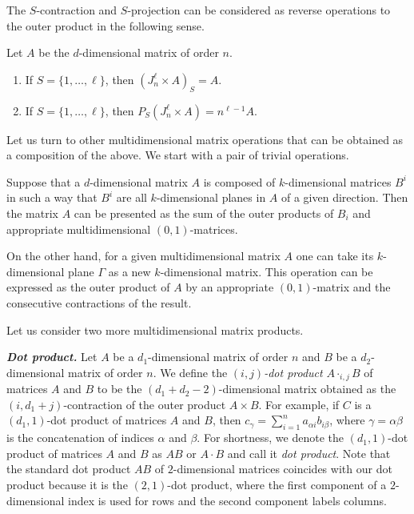 \documentclass[a4paper]{article}
\begin{document}
The $S$-contraction and $S$-projection can be considered as  reverse operations to the outer product in the following sense. 


\begin{utv}
Let $A$ be the $d$-dimensional matrix of order $n$.
\begin{enumerate}
\item If  $S = \{ 1, \ldots, \ell\}$, then $(J_n^{\ell} \times A)_S = A$.
\item If  $S = \{ 1, \ldots, \ell\}$, then  $P_S (J_n^{\ell} \times A) = n^{\ell -1} A$.
\end{enumerate}
\end{utv}


Let us turn to other multidimensional matrix operations that can be obtained as a composition of the above.  We start with a pair of trivial operations.

Suppose that  a $d$-dimensional matrix $A$ is composed of $k$-dimensional matrices $B^i$ in such a way that $B^i$  are  all $k$-dimensional planes in $A$ of a given direction. Then the matrix $A$ can be presented as the sum of the outer products of $B_i$ and appropriate multidimensional $(0,1)$-matrices. 

On the other hand,  for a given multidimensional matrix $A$  one can take its $k$-dimensional plane $\Gamma$ as a new $k$-dimensional matrix. This operation can be expressed as the outer product of $A$ by an appropriate $(0,1)$-matrix and the consecutive contractions of the result. 

Let us consider two more multidimensional matrix products.

\textbf{\textit{Dot product.}}  Let $A$  be a $d_1$-dimensional matrix of order $n$  and $B$ be  a $d_2$-dimensional matrix of order $n$. We define the \textit{$(i,j)$-dot product} $A \cdot_{i,j} B$ of matrices $A$ and $B$ to be the $(d_1 + d_2 - 2)$-dimensional matrix  obtained as the $(i,d_1+ j)$-contraction of the outer product $A \times  B$. For example, if $C$ is a $(d_1, 1)$-dot product of matrices $A$ and $B$, then $c_\gamma = \sum\limits_{i=1}^n a_{\alpha i} b_{i \beta}$, where $\gamma = \alpha \beta$ is the concatenation of indices $\alpha$ and $\beta$. For shortness, we denote the $(d_1, 1)$-dot product of matrices $A$ and $B$ as $AB$ or $A \cdot B$ and call it  \textit{dot product}. Note that the standard dot product $AB$ of $2$-dimensional matrices coincides with our dot product because it is the $(2,1)$-dot product, where the first component of a $2$-dimensional index  is used for rows and the second component labels columns. 
\end{document}
